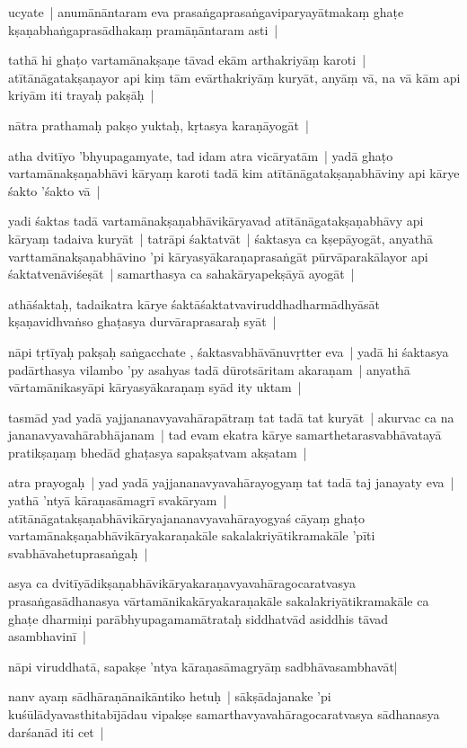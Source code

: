 \documentclass[article,12pt,a4paper]{memoir}
\begin{document}
	  \pstart ucyate | anumānāntaram eva prasaṅgaprasaṅgaviparyayātmakaṃ ghaṭe kṣaṇabhaṅgaprasādhakaṃ pramāṇāntaram asti | 
	\pend
      

	  \pstart tathā hi ghaṭo vartamānakṣaṇe tāvad ekām arthakriyāṃ karoti | atītānāgatakṣaṇayor api kiṃ tām evārthakriyāṃ kuryāt, anyāṃ vā, na vā kām api kriyām iti trayaḥ pakṣāḥ | 
	\pend
      

	  \pstart nātra prathamaḥ pakṣo yuktaḥ, kṛtasya karaṇāyogāt |
	\pend
      

	  \pstart atha dvitīyo 'bhyupagamyate, tad idam atra vicāryatām | yadā ghaṭo vartamānakṣaṇabhāvi kāryaṃ karoti tadā kim atītānāgatakṣaṇabhāviny api kārye śakto 'śakto vā |
	\pend
      

	  \pstart yadi śaktas tadā vartamānakṣaṇabhāvikāryavad atītānāgatakṣaṇabhāvy api kāryaṃ tadaiva kuryāt | tatrāpi śaktatvāt | śaktasya ca kṣepāyogāt, anyathā varttamānakṣaṇabhāvino 'pi kāryasyākaraṇaprasaṅgāt pūrvāparakālayor api śaktatvenāviśeṣāt | samarthasya ca sahakāryapekṣāyā ayogāt | 
	\pend
      

	  \pstart athāśaktaḥ, tadaikatra kārye śaktāśaktatvaviruddhadharmādhyāsāt kṣaṇavidhvaṅso ghaṭasya durvāraprasaraḥ syāt |
	\pend
      

	  \pstart nāpi tṛtīyaḥ pakṣaḥ saṅgacchate , śaktasvabhāvānuvṛtter eva | yadā hi śaktasya padārthasya vilambo 'py asahyas tadā dūrotsāritam akaraṇam | anyathā vārtamānikasyāpi kāryasyākaraṇaṃ syād ity uktam | 
	\pend
      

	  \pstart tasmād yad yadā yajjananavyavahārapātraṃ tat tadā tat kuryāt | akurvac ca na jananavyavahārabhājanam | tad evam ekatra kārye samarthetarasvabhāvatayā pratikṣaṇaṃ bhedād ghaṭasya sapakṣatvam akṣatam |
	\pend
      

	  \pstart atra prayogaḥ | yad yadā yajjananavyavahārayogyaṃ tat tadā taj janayaty eva | yathā 'ntyā kāraṇasāmagrī svakāryam | atītānāgatakṣaṇabhāvikāryajananavyavahārayogyaś cāyaṃ ghaṭo vartamānakṣaṇabhāvikāryakaraṇakāle sakalakriyātikramakāle 'pīti svabhāvahetuprasaṅgaḥ |
	\pend
      

	  \pstart asya ca dvitīyādikṣaṇabhāvikāryakaraṇavyavahāragocaratvasya prasaṅgasādhanasya vārtamānikakāryakaraṇakāle sakalakriyātikramakāle ca ghaṭe dharmiṇi parābhyupagamamātrataḥ siddhatvād asiddhis tāvad asambhavinī |
	\pend
      

	  \pstart nāpi viruddhatā, sapakṣe 'ntya kāraṇasāmagryāṃ sadbhāvasambhavāt| 
	\pend
      

	  \pstart nanv ayaṃ sādhāraṇānaikāntiko hetuḥ | sākṣādajanake 'pi kuśūlādyavasthitabījādau vipakṣe samarthavyavahāragocaratvasya sādhanasya darśanād iti cet | 
	\pend
      
\end{document}

